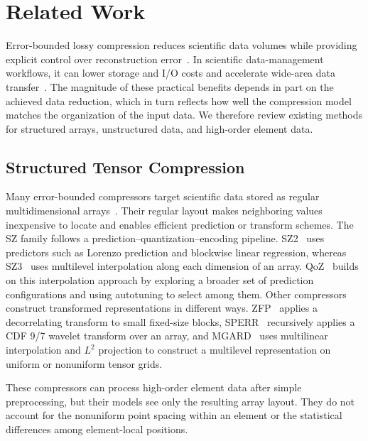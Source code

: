 \section{Related Work}\label{sec:related work}

Error-bounded lossy compression reduces scientific data volumes while providing explicit control over reconstruction error~\cite{zhao2021optimizing,di2025survey}. In scientific data-management workflows, it can lower storage and I/O costs and accelerate wide-area data transfer~\cite{cappello2019usecases,liu2023ocelot,shah2026solver}. The magnitude of these practical benefits depends in part on the achieved data reduction, which in turn reflects how well the compression model matches the organization of the input data. We therefore review existing methods for structured arrays, unstructured data, and high-order element data.

\subsection{Structured Tensor Compression}

Many error-bounded compressors target scientific data stored as regular multidimensional arrays~\cite{di2025survey}. Their regular layout makes neighboring values inexpensive to locate and enables efficient prediction or transform schemes. The SZ family follows a prediction--quantization--encoding pipeline. SZ2~\cite{tao2017significantly} uses predictors such as Lorenzo prediction and blockwise linear regression, whereas SZ3~\cite{zhao2021optimizing,liang2023sz3} uses multilevel interpolation along each dimension of an array. QoZ~\cite{liu2024high} builds on this interpolation approach by exploring a broader set of prediction configurations and using autotuning to select among them. Other compressors construct transformed representations in different ways. ZFP~\cite{lindstrom2014fixed} applies a decorrelating transform to small fixed-size blocks, SPERR~\cite{li2023lossy} recursively applies a CDF 9/7 wavelet transform over an array, and MGARD~\cite{gong2023mgard} uses multilinear interpolation and $L^2$ projection to construct a multilevel representation on uniform or nonuniform tensor grids.

These compressors can process high-order element data after simple preprocessing, but their models see only the resulting array layout. They do not account for the nonuniform point spacing within an element or the statistical differences among element-local positions.

